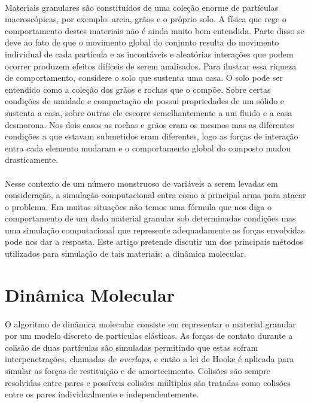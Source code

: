 \documentclass[a4paper,11pt]{article}
\begin{document}
  \paragraph{}Materiais granulares são constituídos de uma
  coleção enorme de partículas macroscópicas, por exemplo:
  areia, grãos e o próprio solo. 
  A física que rege o comportamento destes materiais não é
  ainda muito bem entendida. Parte disso se deve ao fato de
  que o movimento global do conjunto  resulta
  do movimento individual de cada partícula e as incontáveis 
  e aleatórias interações que podem ocorrer produzem efeitos
  difíceis de serem analisados. Para ilustrar essa riqueza
  de comportamento, considere o solo que sustenta uma casa. 
  O solo pode ser entendido como a coleção dos grãos e
  rochas que o compõe. Sobre certas condições de umidade e
  compactação ele possui propriedades de um sólido e sustenta
  a casa, sobre outras ele escorre semelhantemente a um
  fluido e a casa desmorona. Nos dois casos as rochas e
  grãos eram os mesmos mas as diferentes condições a que
  estavam submetidos eram diferentes, logo as forças de
  interação entra cada elemento mudaram e o comportamento
  global do composto mudou drasticamente.
  

  \paragraph{}Nesse contexto de um número
  monstruoso de variáveis a serem levadas em consideração, a
  simulação computacional entra como a principal arma para
  atacar o problema. Em muitas situações não temos uma
  fórmula que nos diga o comportamento de um dado material
  granular sob determinadas condições mas uma simulação
  computacional que represente adequadamente as forças
  envolvidas pode nos dar a resposta. Este artigo pretende
  discutir um dos principais métodos utilizados para
  simulação de tais materiais: a dinâmica molecular.

  \section{Dinâmica Molecular}
  \paragraph{} O algoritmo de dinâmica molecular consiste em
  representar o material granular por um modelo discreto de
  partículas elásticas. As forças de contato durante a
  colisão de duas partículas são simuladas permitindo que
  estas  sofram interpenetrações, chamadas de \emph{overlaps},
  e então a lei de Hooke é aplicada para simular as forças
  de restituição e de amortecimento. Colisões são sempre
  resolvidas entre pares e possíveis colisões múltiplas
  são tratadas como colisões entre os pares individualmente e
  independentemente. 
 
\end{document}

